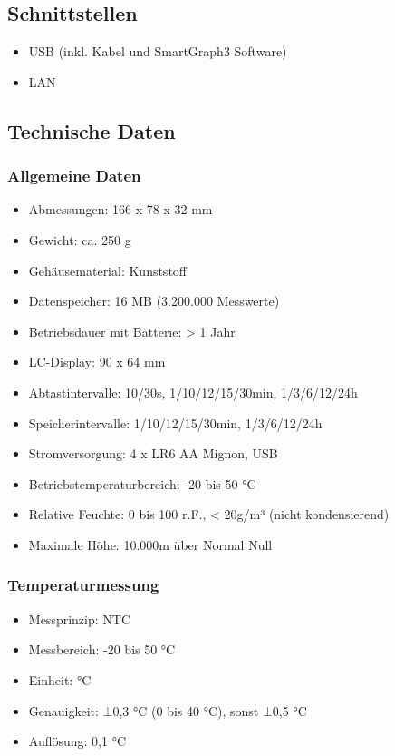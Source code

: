 \subsection{Schnittstellen}
\begin{itemize}
    \item USB (inkl. Kabel und SmartGraph3 Software)
    \item LAN
\end{itemize}

\subsection{Technische Daten}

\subsubsection{Allgemeine Daten}

\begin{itemize}
    \item Abmessungen: 166 x 78 x 32 mm
    \item Gewicht: ca. 250 g
    \item Gehäusematerial: Kunststoff
    \item Datenspeicher: 16 MB (3.200.000 Messwerte)
    \item Betriebsdauer mit Batterie: > 1 Jahr
    \item LC-Display: 90 x 64 mm
    \item Abtastintervalle: 10/30s, 1/10/12/15/30min, 1/3/6/12/24h
    \item Speicherintervalle: 1/10/12/15/30min, 1/3/6/12/24h
    \item Stromversorgung: 4 x LR6 AA Mignon, USB
    \item Betriebstemperaturbereich: -20 bis 50 °C
    \item Relative Feuchte: 0 bis 100 r.F., < 20g/m³ (nicht kondensierend)
    \item Maximale Höhe: 10.000m über Normal Null
\end{itemize}

\subsubsection{Temperaturmessung}

\begin{itemize}
    \item Messprinzip: NTC
    \item Messbereich: -20 bis 50 °C
    \item Einheit: °C
    \item Genauigkeit: ±0,3 °C (0 bis 40 °C), sonst ±0,5 °C
    \item Auflösung: 0,1 °C
\end{itemize}

